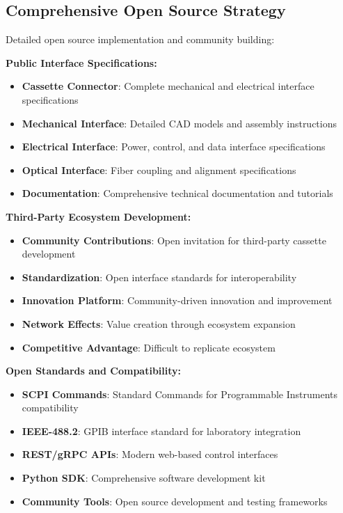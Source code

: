 \documentclass[11pt,a4paper]{article}
\begin{document}
\subsection{Comprehensive Open Source Strategy}
Detailed open source implementation and community building:

\textbf{Public Interface Specifications:}
\begin{itemize}
\item \textbf{Cassette Connector}: Complete mechanical and electrical interface specifications
\item \textbf{Mechanical Interface}: Detailed CAD models and assembly instructions
\item \textbf{Electrical Interface}: Power, control, and data interface specifications
\item \textbf{Optical Interface}: Fiber coupling and alignment specifications
\item \textbf{Documentation}: Comprehensive technical documentation and tutorials
\end{itemize}

\textbf{Third-Party Ecosystem Development:}
\begin{itemize}
\item \textbf{Community Contributions}: Open invitation for third-party cassette development
\item \textbf{Standardization}: Open interface standards for interoperability
\item \textbf{Innovation Platform}: Community-driven innovation and improvement
\item \textbf{Network Effects}: Value creation through ecosystem expansion
\item \textbf{Competitive Advantage}: Difficult to replicate ecosystem
\end{itemize}

\textbf{Open Standards and Compatibility:}
\begin{itemize}
\item \textbf{SCPI Commands}: Standard Commands for Programmable Instruments compatibility
\item \textbf{IEEE-488.2}: GPIB interface standard for laboratory integration
\item \textbf{REST/gRPC APIs}: Modern web-based control interfaces
\item \textbf{Python SDK}: Comprehensive software development kit
\item \textbf{Community Tools}: Open source development and testing frameworks
\end{itemize}
\end{document}
